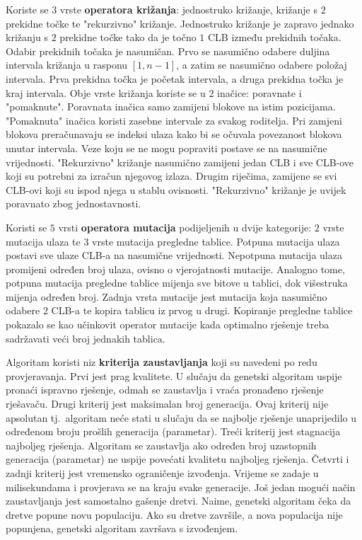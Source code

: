 \documentclass[times, utf8, diplomski]{fer}
\begin{document}
Koriste se $3$ vrste \textbf{operatora križanja}: jednostruko križanje, križanje s $2$ prekidne točke te "rekurzivno" križanje. Jednostruko križanje je zapravo jednako križanju s $2$ prekidne točke tako da je točno $1$ CLB između prekidnih točaka. Odabir prekidnih točaka je nasumičan. Prvo se nasumično odabere duljina intervala križanja u rasponu $[1, n-1]$, a zatim se nasumično odabere položaj intervala. Prva prekidna točka je početak intervala, a druga prekidna točka je kraj intervala. Obje vrste križanja koriste se u $2$ inačice: poravnate i "pomaknute". Poravnata inačica samo zamijeni blokove na istim pozicijama. "Pomaknuta" inačica koristi zasebne intervale za svakog roditelja. Pri zamjeni blokova preračunavaju se indeksi ulaza kako bi se očuvala povezanost blokova unutar intervala. Veze koju se ne mogu popraviti postave se na nasumične vrijednosti. "Rekurzivno" križanje nasumično zamijeni jedan CLB i sve CLB-ove koji su potrebni za izračun njegovog izlaza. Drugim riječima, zamijene se svi CLB-ovi koji su ispod njega u stablu ovisnosti. "Rekurzivno" križanje je uvijek poravnato zbog jednostavnosti.

Koristi se $5$ vrsti \textbf{operatora mutacija} podijeljenih u dvije kategorije: $2$ vrste mutacija ulaza te $3$ vrste mutacija pregledne tablice. Potpuna mutacija ulaza postavi sve ulaze CLB-a na nasumične vrijednosti. Nepotpuna mutacija ulaza promijeni određen broj ulaza, ovisno o vjerojatnosti mutacije. Analogno tome, potpuna mutacija pregledne tablice mijenja sve bitove u tablici, dok višestruka mijenja određen broj. Zadnja vrsta mutacije jest mutacija koja nasumično odabere $2$ CLB-a te kopira tablicu iz prvog u drugi. Kopiranje pregledne tablice pokazalo se kao učinkovit operator mutacije kada optimalno rješenje treba sadržavati veći broj jednakih tablica.

Algoritam koristi niz \textbf{kriterija zaustavljanja} koji su navedeni po redu provjeravanja. Prvi jest prag kvalitete. U slučaju da genetski algoritam uspije pronaći ispravno rješenje, odmah se zaustavlja i vraća pronađeno rješenje rješavaču. Drugi kriterij jest maksimalan broj generacija. Ovaj kriterij nije apsolutan tj.~algoritam neće stati u slučaju da se najbolje rješenje unaprijedilo u određenom broju prošlih generacija (parametar). Treći kriterij jest stagnacija najboljeg rješenja. Algoritam se zaustavlja ako određen broj uzastopnih generacija (parametar) ne uspije povećati kvalitetu najboljeg rješenja. Četvrti i zadnji kriterij jest vremensko ograničenje izvođenja. Vrijeme se zadaje u milisekundama i provjerava se na kraju svake generacije. Još jedan mogući način zaustavljanja jest samostalno gašenje dretvi. Naime, genetski algoritam čeka da dretve popune novu populaciju. Ako su dretve završile, a nova populacija nije popunjena, genetski algoritam završava s izvođenjem.
\end{document}
